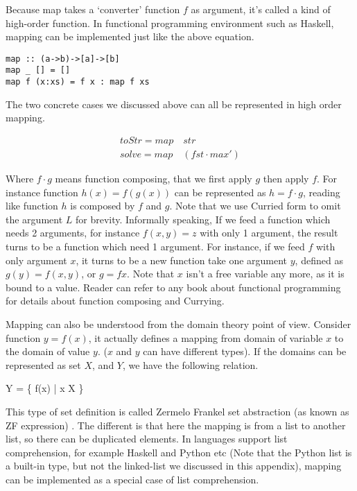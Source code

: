 \documentclass[UTF8]{article}
\begin{document}
Because map takes a `converter' function $f$ as argument, it's called a kind of high-order function. In functional
programming environment such as Haskell, mapping can be implemented just like the above equation.

\lstset{language=Haskell}
\begin{lstlisting}
map :: (a->b)->[a]->[b]
map _ [] = []
map f (x:xs) = f x : map f xs
\end{lstlisting}

The two concrete cases we discussed above can all be represented in high order mapping.

\[
\begin{array}{l}
toStr  = map \quad str \\
solve = map \quad (fst \cdot max')
\end{array}
\]

Where $f \cdot g$ means function composing, that we first apply $g$ then apply $f$. For instance
function $h(x) = f(g(x))$ can be represented as $h = f \cdot g $, reading like function $h$ is
composed by $f$ and $g$. Note that we use Curried form to omit the argument $L$ for brevity.
Informally speaking, If we feed a function which needs 2 arguments, for instance $f(x, y) = z$
with only 1 argument, the result turns to be a function which need 1 argument. For instance,
if we feed $f$ with only argument $x$, it turns to be a new function take one argument $y$,
defined as $g(y) = f(x, y)$, or $g = f x$. Note that $x$ isn't a free variable any more,
as it is bound to a value. Reader can refer to any book about functional programming
for details about function composing and Currying.

Mapping can also be understood from the domain theory point of view. Consider function $y = f(x)$,
it actually defines a mapping from domain of variable $x$ to the domain of value $y$. ($x$
and $y$ can have different types). If the domains can be represented as set $X$, and $Y$, we have
the following relation.

\be
Y = \{ f(x) | x \in X \}
\ee

This type of set definition is called Zermelo Frankel set abstraction (as known as ZF expression) \cite{algo-fp}. The different
is that here the mapping is from a list to another list, so there can be duplicated elements.
In languages support list comprehension, for example Haskell and Python etc (Note that the
Python list is a built-in type, but not the linked-list we discussed in this appendix), mapping
can be implemented as a special case of list comprehension.
\end{document}
